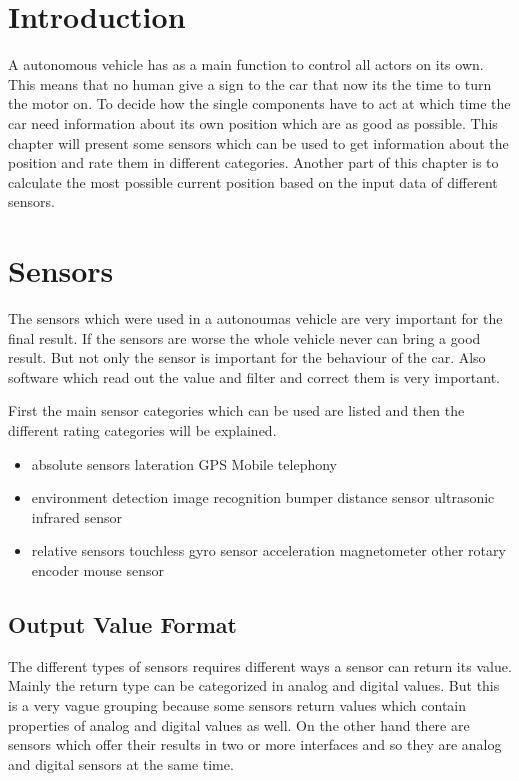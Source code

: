\section{Introduction}\label{sec:positioningIntroduction}
A autonomous vehicle has as a main function to control all actors on its own.
This means that no human give a sign to the car that now its the time to turn the motor on.
To decide how the single components have to act at which time 
the car need information about its own position which are as good as possible.
This chapter will present some sensors which can be used to get information about the position and rate them in different categories.
Another part of this chapter is to calculate the most possible current position based on the input data of different sensors.


\section{Sensors}
The sensors which were used in a autonoumas vehicle are very important for the final result.
If the sensors are worse the whole vehicle never can bring a good result.
But not only the sensor is important for the behaviour of the car.
Also software which read out the value and filter and correct them is very important.

First the main sensor categories which can be used are listed and then the different rating categories will be explained.
\begin{itemize}
\item absolute sensors
	\subitem lateration
		\subsubitem GPS	
		\subsubitem Mobile telephony
\item environment detection
	\subitem image recognition
	\subitem bumper
	\subitem distance sensor
		\subsubitem ultrasonic
		\subsubitem infrared sensor
\item relative sensors
	\subitem touchless
		\subsubitem gyro sensor
		\subsubitem acceleration
		\subsubitem magnetometer
	\subitem other
		\subsubitem rotary encoder
		\subsubitem mouse sensor
\end{itemize}


\subsection{Output Value Format}
The different types of sensors requires different ways a sensor can return its value.
Mainly the return type can be categorized in analog and digital values.
But this is a very vague grouping because some sensors return values which contain properties of analog and digital values as well.
On the other hand there are sensors which offer their results in two or more interfaces and so they are analog and digital sensors at the same time.


